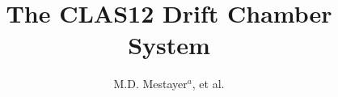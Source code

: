 \documentclass[3p,times,twocolumn]{elsarticle}
\begin{document}

\title{The CLAS12 Drift Chamber System}

\author{M.D. Mestayer$^a$, et al.}

\maketitle



\renewcommand{\thesection}{\Roman{section}}
\renewcommand{\thesubsection}{\thesection-\Alph{subsection}}
\renewcommand{\textfraction}{0.1}
\renewcommand{\topfraction}{0.9}
\renewcommand{\bottomfraction}{0.9}


























\end{document}
